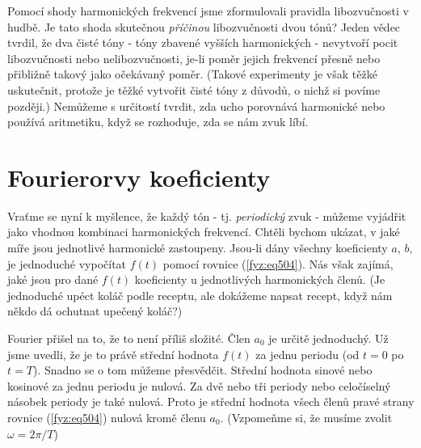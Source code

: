   Pomocí shody harmonických frekvencí jsme zformulovali pravidla libozvučnosti v hudbě. Je tato 
  shoda skutečnou \emph{příčinou} libozvučnosti dvou tónů? Jeden vědec tvrdil, že dva čisté tóny - 
  tóny zbavené vyšších harmonických - nevytvoří pocit libozvučnosti nebo nelibozvučnosti, je-li 
  poměr jejich frekvencí přesně nebo přibližně takový jako očekávaný poměr. (Takové experimenty je 
  však těžké uskutečnit, protože je těžké vytvořit čisté tóny z důvodů, o nichž si povíme později.) 
  Nemůžeme s určitostí tvrdit, zda ucho porovnává harmonické nebo používá aritmetiku, když se 
  rozhoduje, zda se nám zvuk líbí.
  
\section{Fourierorvy koeficienty}\label{fyz:IchapLsecIV}
  Vraťme se nyní k myšlence, že každý tón - tj. \emph{periodický} zvuk - můžeme vyjádřit jako 
  vhodnou kombinaci harmonických frekvencí. Chtěli bychom ukázat, v jaké míře jsou jednotlivé 
  harmonické zastoupeny. Jsou-li dány všechny koeficienty \(a\), \(b\), je jednoduché vypočítat 
  \(f(t)\) pomocí rovnice (\ref{fyz:eq504}). Nás však zajímá, jaké jsou pro dané \(f(t)\) 
  koeficienty u jednotlivých harmonických členů. (Je jednoduché upéct koláč podle receptu, ale 
  dokážeme napsat recept, když nám někdo dá ochutnat upečený koláč?)
  
  Fourier přišel na to, že to není příliš složité. Člen \(a_0\) je určitě jednoduchý. Už jsme 
  uvedli, že je to právě střední hodnota \(f(t)\) za jednu periodu (od \(t= 0\) po \(t = T\)). 
  Snadno se o tom můžeme přesvědčit. Střední hodnota sinové nebo kosinové za jednu periodu je 
  nulová. Za dvě nebo tři periody nebo celočíselný násobek periody je také nulová. Proto je střední 
  hodnota všech členů pravé strany rovnice (\ref{fyz:eq504}) nulová kromě členu \(a_0\). (Vzpomeňme 
  si, že musíme zvolit \(\omega = 2\pi/T\))
  
